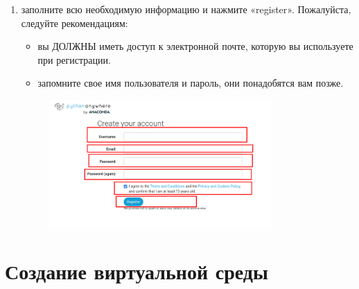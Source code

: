 \documentclass[12pt]{article}
\begin{document}
\begin{enumerate}
    \item заполните всю необходимую информацию и нажмите «register». Пожалуйста, следуйте рекомендациям:
      \begin{itemize}
        \item вы ДОЛЖНЫ иметь доступ к электронной почте, которую вы используете при регистрации.
        \item запомните свое имя пользователя и пароль, они понадобятся вам позже.
          \end{itemize}
	\begin{figure}[H]
		\centering
		\includegraphics[width=0.8\textwidth ,keepaspectratio]{imgs/fill_reg_info.png}
		\caption{}
	\end{figure}
	\end{enumerate}
\section{Создание виртуальной среды}
\end{document}
